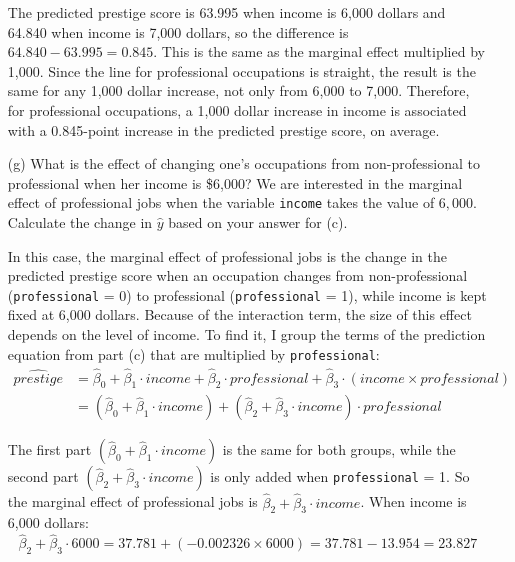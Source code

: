 \documentclass[12pt,letterpaper]{article}
\begin{document}
\begin{enumerate}
	
	
	\noindent The predicted prestige score is 63.995 when income is 6,000 dollars and 64.840 when income is 7,000 dollars, so the difference is $64.840 - 63.995 = 0.845$. This is the same as the marginal effect multiplied by 1,000. Since the line for professional occupations is straight, the result is the same for any 1,000 dollar increase, not only from 6,000 to 7,000. Therefore, for professional occupations, a 1,000 dollar increase in income is associated with a 0.845-point increase in the predicted prestige score, on average.
	
	\vspace{1cm}	
	\item [(g)]
	What is the effect of changing one's occupations from non-professional to professional when her income is \$6,000? We are interested in the marginal effect of professional jobs when the variable \texttt{income} takes the value of $6,000$. Calculate the change in $\hat{y}$ based on your answer for (c).
	
	\noindent In this case, the marginal effect of professional jobs is the change in the predicted prestige score when an occupation changes from non-professional (\texttt{professional} = 0) to professional (\texttt{professional} = 1), while income is kept fixed at 6,000 dollars. Because of the interaction term, the size of this effect depends on the level of income. To find it, I group the terms of the prediction equation from part (c) that are multiplied by \texttt{professional}:
	\begin{align*}
		\widehat{prestige} &= \hat{\beta}_0 + \hat{\beta}_1 \cdot income + \hat{\beta}_2 \cdot professional + \hat{\beta}_3 \cdot (income \times professional) \\
		&= (\hat{\beta}_0 + \hat{\beta}_1 \cdot income) + (\hat{\beta}_2 + \hat{\beta}_3 \cdot income) \cdot professional
	\end{align*}
	
	\noindent The first part $(\hat{\beta}_0 + \hat{\beta}_1 \cdot income)$ is the same for both groups, while the second part $(\hat{\beta}_2 + \hat{\beta}_3 \cdot income)$ is only added when \texttt{professional} = 1. So the marginal effect of professional jobs is $\hat{\beta}_2 + \hat{\beta}_3 \cdot income$. When income is 6,000 dollars:
	\begin{equation*}
		\hat{\beta}_2 + \hat{\beta}_3 \cdot 6000 = 37.781 + (-0.002326 \times 6000) = 37.781 - 13.954 = 23.827
	\end{equation*}
	

\end{enumerate}
\end{document}
